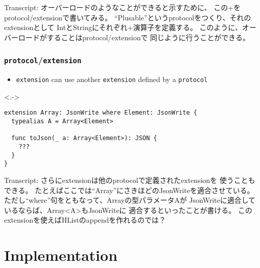 \begin{frame}[fragile]
  \begin{notes}
    \item Transcript:
    オーバーロードのようなことができると示すために、
    この+をprotocol/extensionで書いてみる。
    ``Plusable''というprotocolをつくり、それのextensionとして
    IntとStringにそれぞれ+演算子を定義する。
    このように、オーバーロードがすることはprotocol/extensionで
    同じように行うことができる。
  \end{notes}
\end{frame}

\begin{frame}[fragile]
  \frametitle{\texttt{protocol}/\texttt{extension}}

  \begin{itemize}
    \item<+-> \lstinline|extension| can use another
    \lstinline|extension| defined by a \lstinline|protocol|
  \end{itemize}

  \begin{uncoverenv}<.->
\begin{lstlisting}[style=swift]
extension Array: JsonWrite where Element: JsonWrite {
  typealias A = Array<Element>

  func toJson(_ a: Array<Element>): JSON {
    ???
  }
}
\end{lstlisting}
  \end{uncoverenv}


  \begin{notes}
    \item Transcript:
    さらにextensionは他のprotocolで定義されたextensionを
    使うこともできる。
    たとえばここでは``Array''にさきほどのJsonWriteを適合させている。
    ただし``where''句をともなって、Arrayの型パラメータAが
    JsonWriteに適合しているならば、Array<A>もJsonWriteに
    適合するといったことが書ける。
    このextensionを使えばHListのappendを作れるのでは？
  \end{notes}
\end{frame}

\section{Implementation}

